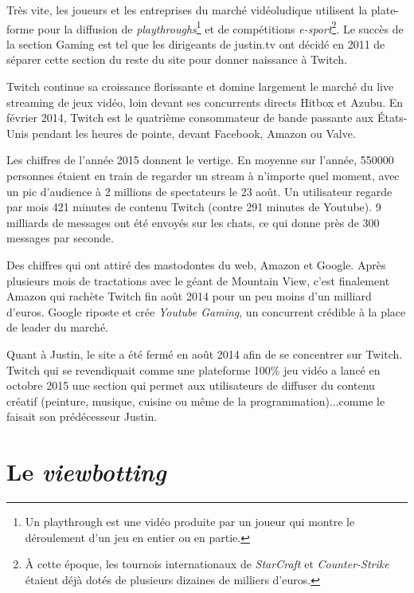 \documentclass[a4paper]{article}
\begin{document}
Très vite, les joueurs et les entreprises du marché vidéoludique utilisent la plate-forme pour la diffusion de \textit{playthroughs}\footnote{Un playthrough est une vidéo produite par un joueur qui montre le déroulement d'un jeu en entier ou en partie.} et de compétitions \textit{e-sport}\footnote{À cette époque, les tournois internationaux de \textit{StarCraft} et \textit{Counter-Strike} étaient déjà dotés de plusieurs dizaines de milliers d'euros.}. Le succès de la section Gaming est tel que les dirigeants de justin.tv ont décidé en 2011 de séparer cette section du reste du site pour donner naissance à Twitch.

Twitch continue sa croissance florissante et domine largement le marché du live streaming de jeux vidéo, loin devant ses concurrents directs Hitbox et Azubu. En février 2014, Twitch est le quatrième consommateur de bande passante aux États-Unis pendant les heures de pointe, devant Facebook, Amazon ou Valve.


Les chiffres de l'année 2015 donnent le vertige. En moyenne sur l'année, 550000 personnes étaient en train de regarder un stream à n'importe quel moment, avec un pic d'audience à 2 millions de spectateurs le 23 août. Un utilisateur regarde par mois 421 minutes de contenu Twitch (contre 291 minutes de Youtube). 9 milliards de messages ont été envoyés sur les chats, ce qui donne près de 300 messages par seconde.

Des chiffres qui ont attiré des mastodontes du web, Amazon et Google. Après plusieurs mois de tractations avec le géant de Mountain View, c'est finalement Amazon qui rachète Twitch fin août 2014 pour un peu moins d'un milliard d'euros. Google riposte et crée \textit{Youtube Gaming}, un concurrent crédible à la place de leader du marché.

Quant à Justin, le site a été fermé en août 2014 afin de se concentrer sur Twitch. Twitch qui se revendiquait comme une plateforme 100\% jeu vidéo a lancé en octobre 2015 une section qui permet aux utilisateurs de diffuser du contenu créatif (peinture, musique, cuisine ou même de la programmation)...comme le faisait son prédécesseur Justin. 

\section{Le \textit{viewbotting}}
\end{document}
